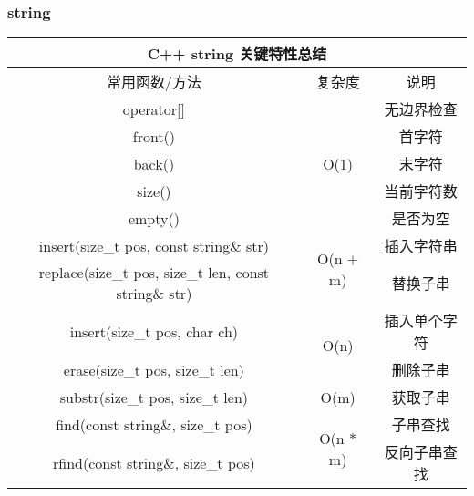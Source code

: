 \subsubsection{string}
\begin{center}
\begin{tabular}{ | c | c | c | }
\hline
\multicolumn{3}{|c|}{C++ string 关键特性总结} \\
\hline
常用函数/方法 & 复杂度 & 说明 \\
\hline
operator[] & \multirow{5}{*}{O(1)} & 无边界检查 \\
front() & & 首字符 \\
back() & & 末字符 \\
size() & & 当前字符数 \\
empty() & & 是否为空 \\
\hline
insert(size\_t pos, const string\& str) & \multirow{2}{*}{O(n $+$ m)} & 插入字符串 \\
replace(size\_t pos, size\_t len, const string\& str) & & 替换子串 \\
\hline
insert(size\_t pos, char ch) & \multirow{2}{*}{O(n)} & 插入单个字符 \\
erase(size\_t pos, size\_t len) & & 删除子串 \\
\hline
substr(size\_t pos, size\_t len) & O(m) & 获取子串 \\
\hline
find(const string\&, size\_t pos) & \multirow{2}{*}{O(n $\ast$ m)} & 子串查找\\
rfind(const string\&, size\_t pos) &  & 反向子串查找 \\
\hline
\end{tabular}
\end{center}

